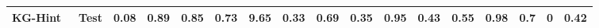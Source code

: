 \begin{table*}[t]
{\begin{tabular}{@{}ll|llll|llll|lll|ll|ll@{}}
KG-Hint~\cite{jatowt_kg_hint}                    & Test                 & 0.08                                                                    & 0.89                                                                     & 0.85                                                                  & 0.73                                                                  & 9.65                                                                    & 0.33                                                                  & 0.69                                                                  & 0.35                                                                   & 0.95                                                                    & 0.43                                                                  & 0.55                                                                   & 0.98                                                                   & 0.7                                                                    & 0                                                                        & 0.42                                                                     \\ \bottomrule
\end{tabular}%
}
\end{table*}